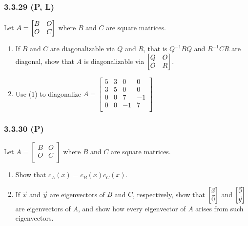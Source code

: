 \documentclass[pdf,9pt,t]{beamer}
\begin{document}
\begin{frame}[fragile]
    \frametitle{3.3.29 (P, L)}
    \begin{problem}
	Let $A=\begin{bmatrix} B & O\cr O & C \end{bmatrix} $ where $B$ and $C$ are square matrices.
	\begin{enumerate}
	    \item If $B$ and $C$ are diagonalizable via $Q$ and $R$, that is $Q^{-1}BQ$ and $R^{-1}CR$ are diagonal, show that $A$ is diagonalizable via $\begin{bmatrix} Q & O
		\cr O & R \end{bmatrix} $.
	    \item Use (1) to diagonalize $A =
		    \begin{bmatrix}
			5 & 3 & 0  & 0  \\
			3 & 5 & 0  & 0  \\
			0 & 0 & 7  & -1 \\
			0 & 0 & -1 & 7  \\
		    \end{bmatrix}$
	\end{enumerate}
    \end{problem}
\end{frame}

\begin{frame}[fragile]
    \frametitle{3.3.30 (P)}
    \begin{problem}
	Let $A=
	\begin{bmatrix}
	B & O\\
	O & C\\
	\end{bmatrix}$ where $B$ and $C$ are square matrices.
	\begin{enumerate}
	    \item Show that $c_A(x)=c_B(x)c_C(x)$.
	    \item If $\vec{x}$ and $\vec{y}$ are eigenvectors of $B$ and $C$, respectively, show that $\begin{bmatrix} \vec{x}\cr \vec{0}   \end{bmatrix} $
		and $\begin{bmatrix} \vec{0}\cr \vec{y}   \end{bmatrix}$ are eigenvectors of $A$, and show how every eigenvector of $A$
		arises from such eigenvectors.
	\end{enumerate}
    \end{problem}
\end{frame}
\end{document}
